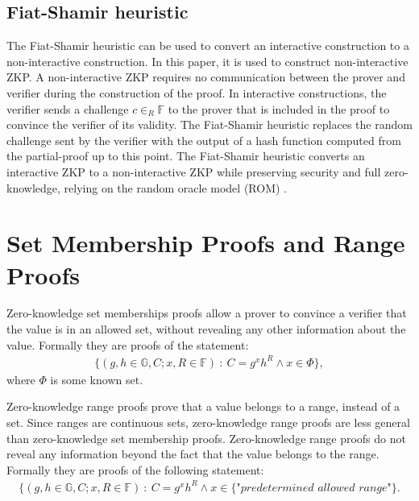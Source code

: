 \subsection*{Fiat-Shamir heuristic}
The Fiat-Shamir heuristic \cite{Fiat-Shamir} can be used to convert an interactive construction to a non-interactive construction. In this paper, it is used to construct non-interactive ZKP. A non-interactive  ZKP requires no communication between the prover and verifier during the construction of the proof. In interactive constructions, the verifier sends a challenge $c\in_R\mathds{F}$ to the prover that is included in the proof to convince the verifier of its validity. The Fiat-Shamir heuristic replaces the random challenge sent by the verifier with the output of a hash function computed from the partial-proof up to this point. The Fiat-Shamir heuristic converts an interactive ZKP to a non-interactive  ZKP while preserving security and full zero-knowledge, relying on the random oracle model (ROM) \cite{Fiat-Shamir} .




\section{Set Membership Proofs and Range Proofs}
\label{sec:RF_theory}
Zero-knowledge set memberships proofs allow a prover to convince a verifier that the value is in an allowed set, without revealing any other information about the value. Formally they are proofs of the statement:
\begin{align} \label{eq:SM_statement}
    \{(g,h\in\mathds{G},C;x,R\in\mathds{F})\::\:C= g^x h^R \wedge x \in \Phi\},
\end{align}
where $\Phi$ is some known set. 
 
Zero-knowledge range proofs prove that a value belongs to a range, instead of a set. Since ranges are continuous sets, zero-knowledge range proofs are less general than zero-knowledge set membership proofs.  Zero-knowledge range proofs do not reveal any information beyond the fact that the value belongs to the range. Formally they are proofs of the following statement: 
\begin{align} \label{eq:RP_statement}
    \{(g,h\in\mathds{G},C;x,R\in\mathds{F})\::\:C= g^x h^R \wedge x \in \{\textit{"predetermined allowed range"}\}.
\end{align}

